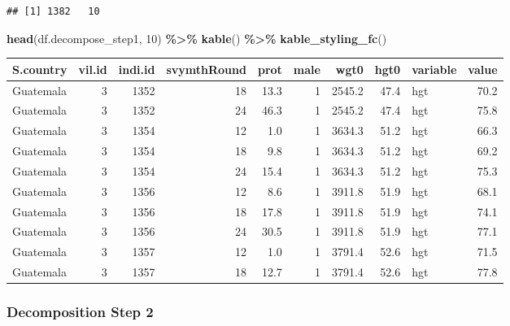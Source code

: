 \documentclass[
]{book}
\newenvironment{Shaded}{\begin{snugshade}}{\end{snugshade}}
\newcommand{\DecValTok}[1]{\textcolor[rgb]{0.00,0.00,0.81}{#1}}
\newcommand{\KeywordTok}[1]{\textcolor[rgb]{0.13,0.29,0.53}{\textbf{#1}}}
\newcommand{\NormalTok}[1]{#1}
\newcommand{\OperatorTok}[1]{\textcolor[rgb]{0.81,0.36,0.00}{\textbf{#1}}}
\newcommand{\StringTok}[1]{\textcolor[rgb]{0.31,0.60,0.02}{#1}}
\begin{document}
\begin{verbatim}
## [1] 1382   10
\end{verbatim}

\begin{Shaded}
\begin{Highlighting}[]
\KeywordTok{head}\NormalTok{(df.decompose\_step1, }\DecValTok{10}\NormalTok{) }\OperatorTok{\%\textgreater{}\%}
\StringTok{  }\KeywordTok{kable}\NormalTok{() }\OperatorTok{\%\textgreater{}\%}
\StringTok{  }\KeywordTok{kable\_styling\_fc}\NormalTok{()}
\end{Highlighting}
\end{Shaded}

\begin{table}[!h]
\centering
\begin{tabular}{l|r|r|r|r|r|r|r|l|r}
\hline
S.country & vil.id & indi.id & svymthRound & prot & male & wgt0 & hgt0 & variable & value\\
\hline
\rowcolor{gray!6}  Guatemala & 3 & 1352 & 18 & 13.3 & 1 & 2545.2 & 47.4 & hgt & 70.2\\
\hline
Guatemala & 3 & 1352 & 24 & 46.3 & 1 & 2545.2 & 47.4 & hgt & 75.8\\
\hline
\rowcolor{gray!6}  Guatemala & 3 & 1354 & 12 & 1.0 & 1 & 3634.3 & 51.2 & hgt & 66.3\\
\hline
Guatemala & 3 & 1354 & 18 & 9.8 & 1 & 3634.3 & 51.2 & hgt & 69.2\\
\hline
\rowcolor{gray!6}  Guatemala & 3 & 1354 & 24 & 15.4 & 1 & 3634.3 & 51.2 & hgt & 75.3\\
\hline
Guatemala & 3 & 1356 & 12 & 8.6 & 1 & 3911.8 & 51.9 & hgt & 68.1\\
\hline
\rowcolor{gray!6}  Guatemala & 3 & 1356 & 18 & 17.8 & 1 & 3911.8 & 51.9 & hgt & 74.1\\
\hline
Guatemala & 3 & 1356 & 24 & 30.5 & 1 & 3911.8 & 51.9 & hgt & 77.1\\
\hline
\rowcolor{gray!6}  Guatemala & 3 & 1357 & 12 & 1.0 & 1 & 3791.4 & 52.6 & hgt & 71.5\\
\hline
Guatemala & 3 & 1357 & 18 & 12.7 & 1 & 3791.4 & 52.6 & hgt & 77.8\\
\hline
\end{tabular}
\end{table}

\hypertarget{decomposition-step-2}{%
\subsubsection{Decomposition Step 2}\label{decomposition-step-2}}
\end{document}
